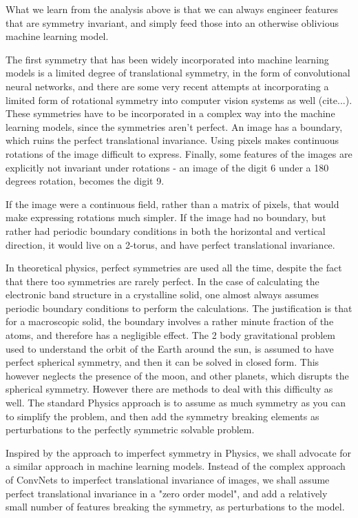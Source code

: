 \documentclass[twocolumn, prl]{revtex4-1}
\begin{document}
What we learn from the analysis above is that we can always engineer features that are symmetry invariant, and simply feed those into an otherwise oblivious machine learning model.



The first symmetry that has been widely incorporated into machine learning models is a limited degree of translational symmetry, in the form of convolutional neural networks, and there are some very recent attempts at incorporating a limited form of rotational symmetry into computer vision systems as well (cite...). These symmetries have to be incorporated in a complex way into the machine learning models, since the symmetries aren't perfect. An image has a boundary, which ruins the perfect translational invariance. Using pixels makes continuous rotations of the image difficult to express. Finally, some features of the images are explicitly not invariant under rotations - an image of the digit 6 under a 180 degrees rotation, becomes the digit 9.

If the image were a continuous field, rather than a matrix of pixels, that would make expressing rotations much simpler. If the image had no boundary, but rather had periodic boundary conditions in both the horizontal and vertical direction, it would live on a 2-torus, and have perfect translational invariance.

In theoretical physics, perfect symmetries are used all the time, despite the fact that there too symmetries are rarely perfect. In the case of calculating the electronic band structure in a crystalline solid, one almost always assumes periodic boundary conditions to perform the calculations. The justification is that for a macroscopic solid, the boundary involves a rather minute fraction of the atoms, and therefore has a negligible effect. 
The 2 body gravitational problem used to understand the orbit of the Earth around the sun, is assumed to have perfect spherical symmetry, and then it can be solved in closed form. This however neglects the presence of the moon, and other planets, which disrupts the spherical symmetry. However there are methods to deal with this difficulty as well. The standard Physics approach is to assume as much symmetry as you can to simplify the problem, and then add the symmetry breaking elements as perturbations to the perfectly symmetric solvable problem. 

Inspired by the approach to imperfect symmetry in Physics, we shall advocate for a similar approach in machine learning models. Instead of the complex approach of ConvNets to imperfect translational invariance of images, we shall assume perfect translational invariance in a "zero order model", and add a relatively small number of features breaking the symmetry, as perturbations to the model.
\end{document}
